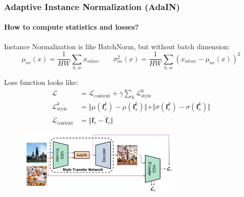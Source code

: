 \documentclass[10pt]{beamer}
\begin{document}
\begin{frame}
\frametitle{Adaptive Instance Normalization (AdaIN)}
\framesubtitle{How to compute statistics and losses?}

Instance Normalization is like BatchNorm, but without batch dimension:
\[
\mu_{nc}(x) = \frac{1}{HW} \sum_{h, w} x_{nhwc} \qquad \sigma^2_{nc}(x) = \frac{1}{HW} \sum_{h,w} \left(x_{nhwc} - \mu_{nc}(x)\right)^2
\]

Loss function looks like:
\begin{equation*}
\begin{split}
\mathcal{L} & = \mathcal{L}_\text{content} + \gamma\sum_{k} \mathcal{L}_\text{style}^k \\
\mathcal{L}_\text{style}^k &= \Vert \mu(\bm f^k_r) - \mu(\bm f^k_s) \Vert + \Vert \sigma(\bm f^k_r) - \sigma(\bm f^k_s) \Vert \\
\mathcal{L}_\text{content} &= \Vert \bm f_r - \hat{\bm f}_r \Vert
\end{split}
\end{equation*}

\begin{figure}
\centering
\includegraphics[width=0.7\textwidth]{images/AdaIN-style-transfer}
\end{figure}
\end{frame}
\end{document}
